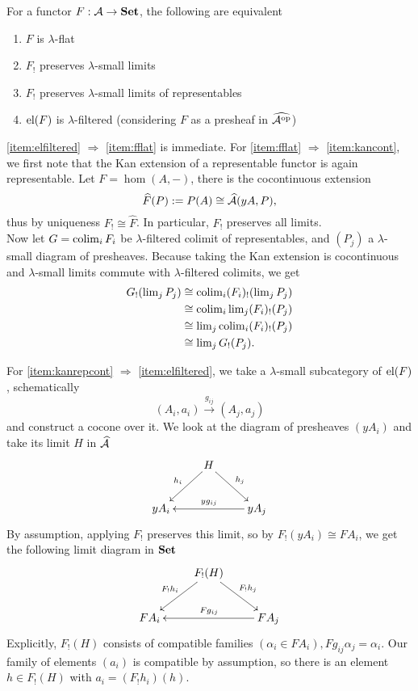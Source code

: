 \begin{Proposition}\label{prop:flat}
For a functor $F : \mathcal{A} \to \mathbf{Set}$, the following are equivalent
\begin{enumerate}
\item $F$ is $\lambda$-flat \label{item:fflat}
\item $F_!$ preserves $\lambda$-small limits \label{item:kancont}
\item $F_!$ preserves $\lambda$-small limits of representables \label{item:kanrepcont}
\item $\textrm{el}(F)$ is $\lambda$-filtered (considering $F$ as a presheaf in $\widehat{\mathcal{A}^{\textrm{op}}}$) \label{item:elfiltered}
\end{enumerate}
\end{Proposition}
\begin{Proof}
\ref{item:elfiltered} $\Rightarrow$ \ref{item:fflat} is immediate. For \ref{item:fflat} $\Rightarrow$ \ref{item:kancont}, we first note that the Kan extension of a representable functor is again representable. Let $F=\hom(A,-)$, there is the cocontinuous extension \[ \widehat F(P) := P(A) \cong \widehat{\mathcal{A}}(yA,P), \]
thus by uniqueness $F_! \cong \widehat F$. In particular, $F_!$ preserves all limits. \\

Now let $G = \operatorname{colim}_i F_i$ be $\lambda$-filtered colimit of representables, and $(P_j)$ a $\lambda$-small diagram of presheaves. Because taking the Kan extension is cocontinuous and $\lambda$-small limits commute with $\lambda$-filtered colimits, we get
\begin{align*}
G_!(\operatorname{lim}_j P_j) &\cong \operatorname{colim}_i (F_i)_!(\operatorname{lim}_j P_j) \\
&\cong \operatorname{colim}_i \operatorname{lim}_j (F_i)_!(P_j) \\
&\cong \operatorname{lim}_j  \operatorname{colim}_i (F_i)_!(P_j) \\
&\cong \operatorname{lim}_j G_!(P_j).
\end{align*}

For \ref{item:kanrepcont} $\Rightarrow$ \ref{item:elfiltered}, we take a $\lambda$-small subcategory of $\textrm{el}(F)$, schematically
\[ (A_i,a_i) \xrightarrow{g_{ij}} (A_j,a_j) \]
and construct a cocone over it. We look at the diagram of presheaves $(yA_i)$ and take its limit $H$ in $\widehat{\mathcal{A}}$
\[
\xymatrix{
& H \ar[ld]_{h_i} \ar[rd]^{h_j} \\
yA_i & & yA_j \ar[ll]_{yg_{ij}}
}\]
By assumption, applying $F_!$ preserves this limit, so by $F_!(yA_i) \cong FA_i$, we get the following limit diagram in $\mathbf{Set}$
\[
\xymatrix{
& F_!(H) \ar[ld]_{F_!h_i} \ar[rd]^{F_!h_j} \\
FA_i & & FA_j \ar[ll]_{Fg_{ij}}
}\]
Explicitly, $F_!(H)$ consists of compatible families $(\alpha_i \in FA_i), Fg_{ij}\alpha_j = \alpha_i$. Our family of elements $(a_i)$ is compatible by assumption, so there is an element $h \in F_!(H)$ with $a_i = (F_!h_i)(h)$. \\


\end{Proof}
